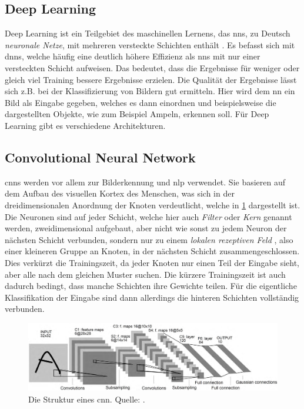 \subsection{Deep Learning}
Deep Learning ist ein Teilgebiet des maschinellen Lernens, das \acp{nn}, zu Deutsch \emph{neuronale Netze}, mit mehreren versteckte Schichten enthält \citep{deeplearningreview}.
Es befasst sich mit \acp{dnn}, welche häufig eine deutlich höhere Effizienz als \acp{nn} mit nur einer versteckten Schicht aufweisen.
Das bedeutet, dass die Ergebnisse für weniger oder gleich viel Training bessere Ergebnisse erzielen.
Die Qualität der Ergebnisse lässt sich z.B. bei der Klassifizierung von Bildern gut ermitteln.
Hier wird dem \ac{nn} ein Bild als Eingabe gegeben, welches es dann einordnen und beispielsweise die dargestellten Objekte, wie zum Beispiel Ampeln, erkennen soll.
Für Deep Learning gibt es verschiedene Architekturen.

\subsection{Convolutional Neural Network}
\acp{cnn} werden vor allem zur Bilderkennung und \ac{nlp} verwendet.
Sie basieren auf dem Aufbau des visuellen Kortex des Menschen, was sich in der dreidimensionalen Anordnung der Knoten verdeutlicht,
welche in \cref{fig:struktur-cnn} dargestellt ist.
Die Neuronen sind auf jeder Schicht, welche hier auch \emph{Filter} oder \emph{Kern} genannt werden,
zweidimensional aufgebaut, aber nicht wie sonst zu jedem Neuron der nächsten Schicht verbunden,
sondern nur zu einem \emph{lokalen rezeptiven Feld} \citep{deeplearningnature},
also einer kleineren Gruppe an Knoten, in der nächsten Schicht zusammengeschlossen.
Dies verkürzt die Trainingszeit, da jeder Knoten nur einen Teil der Eingabe sieht, aber alle nach dem gleichen Muster suchen.
Die kürzere Trainingszeit ist auch dadurch bedingt, dass manche Schichten ihre Gewichte teilen.
Für die eigentliche Klassifikation der Eingabe sind dann allerdings die hinteren Schichten vollständig verbunden.
\begin{figure}%
\centering
\includegraphics[width=\textwidth, height=\textheight, keepaspectratio]{Images/CNN.png}
\caption[Struktur von CNNs]{Die Struktur eines \ac{cnn}. Quelle: \citet{deeplearningarchitecturesreview}.}
\label{fig:struktur-cnn}
\end{figure}

